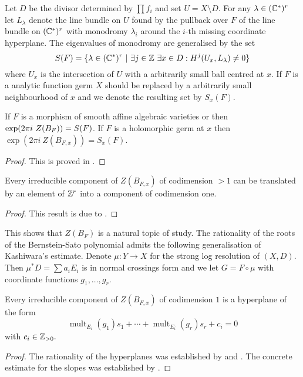 Let $D$ be the divisor determined by $\prod f_i$ and set $U= X\setminus D$.
For any $\lambda \in (\mathbb{C}^*)^r$ let $L_\lambda$ denote the line bundle on $U$ found by the pullback over $F$ of the line bundle on $(\mathbb{C}^*)^r$ with monodromy $\lambda_i$ around the $i$-th missing coordinate hyperplane.
The eigenvalues of monodromy are generalised by the set
$$S(F) = \{\lambda \in (\mathbb{C}^*)^r \ \vert\  \exists j\in \mathbb{Z}\  \exists x\in D: H^j(U_x,L_\lambda) \neq 0\} $$
where $U_x$ is the intersection of $U$ with a arbitrarily small ball centred at $x$.
If $F$ is a analytic function germ $X$ should be replaced by a arbitrarily small neighbourhood of $x$ and we denote the resulting set by $S_x(F)$.
\begin{theorem}
  If $F$ is a morphism of smooth affine algebraic varieties or then $\exp(2\pi i\ Z(\allowbreak B_F)) = S(F)$. If $F$ is a holomorphic germ at $x$ then $\exp(2\pi i\ Z(B_{F,x})) = S_x(F)$.
\end{theorem}
\begin{proof}
  This is proved in \cite{budur2019zero}.
\end{proof}
\begin{theorem}
  Every irreducible component of $Z(B_{F,x})$ of codimension $>1$ can be translated by an element of $\mathbb{Z}^r$ into a component of codimension one.
\end{theorem}
\begin{proof}
  This result is due to \cite{maisonobe2016filtration}.
\end{proof}
This shows that $Z(B_{F})$ is a natural topic of study.
The rationality of the roots of the Bernstein-Sato polynomial admits the following generalisation of Kashiwara's estimate.
Denote $\mu:Y\to X$ for the strong log resolution of $(X,D)$.
Then $\mu^*D = \sum a_i E_i$ is in normal crossings form and we let $G = F\circ \mu$ with coordinate functions $g_1,\ldots, g_r$.
\begin{theorem}\label{thm: Slopes}
  Every irreducible component of $Z(B_{F,x})$ of codimension $1$ is a hyperplane of the form
  $$\operatorname{mult}_{E_i}(g_1) s_1 + \cdots + \operatorname{mult}_{E_i}(g_r)s_r + c_i=0 $$
  with $c_i\in \mathbb{Z}_{>0}.$
\end{theorem}
\begin{proof}
  The rationality of the hyperplanes was established by \cite{sabbah1987proximite} and \cite{gyoja1993bernstein}.
  The concrete estimate for the slopes was established by \cite{budur2020zero}.
\end{proof}


